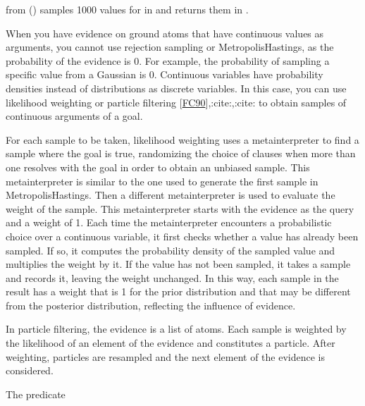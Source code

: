 \documentclass[letterpaper,10pt,english]{sphinxmanual}
\begin{document}
\sphinxAtStartPar
from () samples 1000 values for  in  and returns them in .

\sphinxAtStartPar
When you have evidence on ground atoms that have continuous values as arguments, you cannot use rejection sampling or Metropolis\sphinxhyphen{}Hastings, as the probability of the evidence is 0. For example, the probability of sampling a specific value from a Gaussian is 0.
Continuous variables have probability densities instead of distributions as discrete variables. In this case, you can use likelihood weighting or particle filtering {[}\hyperlink{cite.index:id56}{FC90}{]},:cite:,:cite: to obtain samples of continuous arguments of a goal.

\sphinxAtStartPar
For each sample to be taken, likelihood weighting uses a meta\sphinxhyphen{}interpreter to find a sample where the goal is true, randomizing the choice of clauses when more than one resolves with the goal in order to obtain an unbiased sample.
This meta\sphinxhyphen{}interpreter is similar to the one used to generate the first sample in Metropolis\sphinxhyphen{}Hastings.
Then a different meta\sphinxhyphen{}interpreter is used to evaluate the weight of the sample.
This meta\sphinxhyphen{}interpreter starts with the evidence as the query and a weight of 1.
Each time the meta\sphinxhyphen{}interpreter encounters a probabilistic choice over a continuous variable, it first checks whether a value has already been sampled.
If so, it computes the probability density of the sampled value and multiplies the weight by it.
If the value has not been sampled, it takes a sample and records it, leaving the weight unchanged.
In this way, each sample in the result has a weight that is 1 for the prior distribution and that may be different from the posterior distribution, reflecting the influence of evidence.

\sphinxAtStartPar
In particle filtering, the evidence is a list of atoms. Each sample is weighted by the likelihood of an element of the evidence and constitutes a particle.
After weighting, particles are resampled and the next element of the evidence is considered.

\sphinxAtStartPar
The predicate

\begin{sphinxVerbatim}[commandchars=\\\{\}]
  
\end{sphinxVerbatim}
\end{document}
